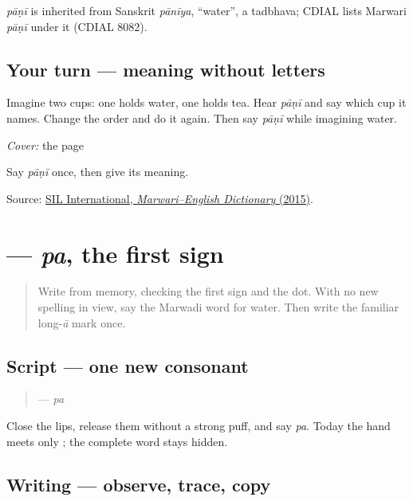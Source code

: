 \begin{cousinweb}
\emph{pāṇī} is inherited from Sanskrit \emph{pānīya}, \textquotedblleft{}water\textquotedblright{}, a tadbhava; CDIAL lists Marwari \emph{pāṇī} under it (CDIAL 8082).
\end{cousinweb}

\subsection*{Your turn — meaning without letters}
Imagine two cups: one holds water, one holds tea. Hear \emph{pāṇī} and say which cup it names. Change the order and do it again. Then say \emph{pāṇī} while imagining water.

\begin{tcolorbox}[breakable,colback=teal!4,colframe=teal!35!black,title={Before you move on}]
\emph{Cover:} the page

Say \emph{pāṇī} once, then give its meaning.

Source: \href{https://nepal.sil.org/resources/archives/63768}{SIL International, \emph{Marwari–English Dictionary} (2015)}.
\end{tcolorbox}
\section[\texorpdfstring{\mw{प} (pa)}{प (pa)}]{ — \emph{pa}, the first sign}

\label{lesson:MW-W04-pa}



\begin{quote}
Write \textbf{} from memory, checking the first sign and the dot. With no new spelling in view, say the Marwadi word for water. Then write the familiar long-\emph{ā} mark \textbf{} once.
\end{quote}

\subsection*{Script — one new consonant}
\begin{quote}
\textbf{} — \emph{pa}
\end{quote}

Close the lips, release them without a strong puff, and say \emph{pa}. Today the hand meets only \textbf{}; the complete word stays hidden.

\subsection*{Writing — observe, trace, copy}


